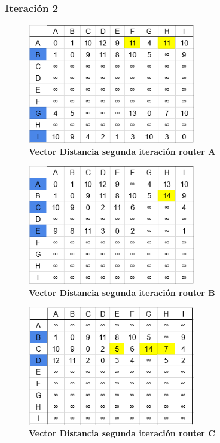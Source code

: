 \documentclass[12pt]{article}
\begin{document}
\newpage

\subsubsection{Iteración 2}

\begin{figure}[H] 
\centering 
\includegraphics[width=0.65\textwidth]{imagenes/2A2.png} \caption{\small \textbf{Vector Distancia segunda iteración router A}}
\label{fig:diagrama_26} 
\end{figure}
\begin{figure}[H] 
\centering 
\includegraphics[width=0.65\textwidth]{imagenes/2B2.png} \caption{\small \textbf{Vector Distancia segunda iteración router B}}
\label{fig:diagrama_27} 
\end{figure}
\begin{figure}[H] 
\centering 
\includegraphics[width=0.65\textwidth]{imagenes/2C2.png} \caption{\small \textbf{Vector Distancia segunda iteración router C}}
\label{fig:diagrama_28} 
\end{figure}
\end{document}
